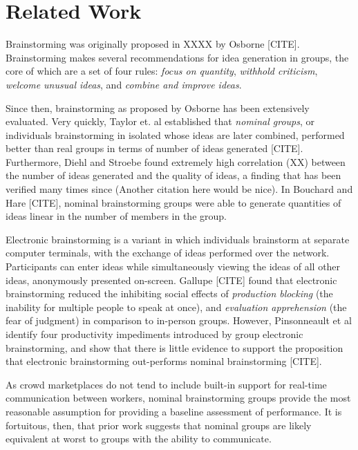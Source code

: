 \section{Related Work}


Brainstorming was originally proposed in XXXX by Osborne [CITE]. Brainstorming makes several recommendations for idea generation in groups, the core of which are a set of four rules: \emph{focus on quantity}, \emph{withhold criticism}, \emph{welcome unusual ideas}, and \emph{combine and improve ideas}.

Since then, brainstorming as proposed by Osborne has been extensively evaluated. Very quickly, Taylor et. al established that \emph{nominal groups}, or individuals brainstorming in isolated whose ideas are later combined, performed better than real groups in terms of number of ideas generated [CITE]. Furthermore, Diehl and Stroebe found extremely high correlation (XX) between the number of ideas generated and the quality of ideas, a finding that has been verified many times since (Another citation here would be nice). In Bouchard and Hare [CITE], nominal brainstorming groups were able to generate quantities of ideas linear in the number of members in the group.

Electronic brainstorming is a variant in which individuals brainstorm at separate computer terminals, with the exchange of ideas performed over the network. Participants can enter ideas while simultaneously viewing the ideas of all other ideas, anonymously presented on-screen. Gallupe [CITE] found that electronic brainstorming reduced the inhibiting social effects of \emph{production blocking} (the inability for multiple people to speak at once), and \emph{evaluation apprehension} (the fear of judgment) in comparison to in-person groups. However, Pinsonneault et al identify four productivity impediments introduced by group electronic brainstorming, and show that there is little evidence to support the proposition that electronic brainstorming out-performs nominal brainstorming [CITE].

As crowd marketplaces do not tend to include built-in support for real-time communication between workers, nominal brainstorming groups provide the most reasonable assumption for providing a baseline assessment of performance. It is fortuitous, then, that prior work suggests that nominal groups are likely equivalent at worst to groups with the ability to communicate.

